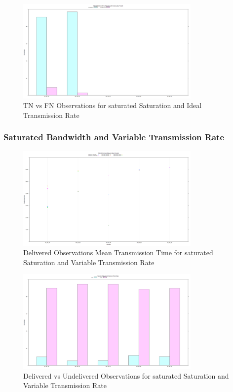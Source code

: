 	\begin{figure}[H]
	\centering
	\includegraphics[width=0.8\textwidth]{Chap7/figures/plots/saturated_ideal/tnvsfn_percent.png}
	\caption{TN vs FN Observations for saturated Saturation and Ideal Transmission Rate}
	\label{fig:sim:res:sat:ideal:tnfn}
	\end{figure}
	
\subsubsection{Saturated Bandwidth and Variable Transmission Rate}
	\begin{figure}[H]
	\centering
	\includegraphics[width=0.8\textwidth]{Chap7/figures/plots/saturated_variable/delivered_mean.png}
	\caption{Delivered Observations Mean Transmission Time for saturated Saturation and Variable Transmission Rate}
	\label{fig:sim:res:sat:variable:delmean}
	\end{figure}

	\begin{figure}[H]
	\centering
	\includegraphics[width=0.8\textwidth]{Chap7/figures/plots/saturated_variable/delvsundel_percent.png}
	\caption{Delivered vs Undelivered Observations for saturated Saturation and Variable Transmission Rate}
	\label{fig:sim:res:sat:variable:delundel}
	\end{figure}

